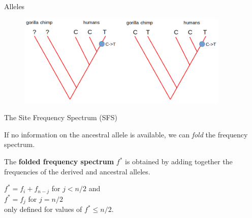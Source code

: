 \begin{frame}{Alleles}

        \begin{figure}
                \includegraphics[width=0.9\textwidth]{Pics/ancder_unknown}
        \end{figure}

\end{frame}


\begin{frame}{The Site Frequency Spectrum (SFS)}

	If no information on the ancestral allele is available, we can \textit{fold} the frequency
	spectrum.
	\begin{block}{}
	The \textbf{folded frequency spectrum} $f^*$ is obtained by adding together the frequencies
	of the derived and ancestral alleles.
	\end{block}

	$f^* = f_i + f_{n-j}$ for $j<n/2$ and \\
	$f^* = f_j$ for $j=n/2$ \\
	only defined for values of $f^* \leq n/2$.

\end{frame}


